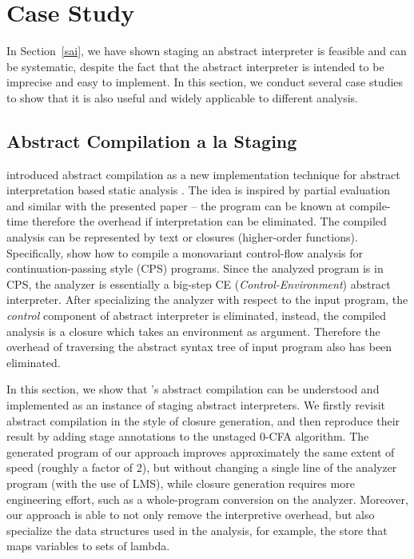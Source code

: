 \section{Case Study} \label{cases_study}

In Section~\ref{sai}, we have shown staging an abstract interpreter is feasible and can be 
systematic, despite the fact that the abstract interpreter is intended to be imprecise and easy to implement. 
In this section, we conduct several case studies to show that it is also useful and widely
applicable to different analysis.

\subsection{Abstract Compilation a la Staging} \label{cs_ac}

\citeauthor{Boucher:1996:ACN:647473.727587} introduced abstract compilation as a new
implementation technique for abstract interpretation based static analysis \cite{Boucher:1996:ACN:647473.727587}.
The idea is inspired by partial evaluation and similar with the presented paper -- the program can be known 
at compile-time therefore the overhead if interpretation can be eliminated. The compiled analysis
can be represented by text or closures (higher-order functions).
Specifically, \citeauthor{Boucher:1996:ACN:647473.727587} show how to compile a monovariant control-flow 
analysis \cite{Shivers:1991:SSC:115865.115884, Shivers:1988:CFA:53990.54007} 
for continuation-passing style (CPS) programs. Since the analyzed program is in CPS, the analyzer 
is essentially a big-step CE (\textit{Control-Environment}) abstract interpreter.
After specializing the analyzer with respect to the input program, the \textit{control} component of 
abstract interpreter is eliminated, instead, the compiled analysis is a closure which takes an 
environment as argument. Therefore the overhead of traversing the abstract syntax tree of input 
program also has been eliminated.

In this section, we show that \citeauthor{Boucher:1996:ACN:647473.727587}'s abstract compilation can be 
understood and implemented as an instance of staging abstract interpreters.
We firstly revisit abstract compilation in the style of closure generation,
and then reproduce their result by adding stage annotations to the unstaged 0-CFA algorithm.
The generated program of our approach improves approximately the same extent of speed (roughly a factor of 2),
but without changing a single line of the analyzer program (with the use of LMS), 
while closure generation requires more engineering effort, such as a whole-program 
conversion on the analyzer. Moreover, our approach is able to not only remove the interpretive
overhead, but also specialize the data structures used in the analysis, for example, the store
that maps variables to sets of lambda.

